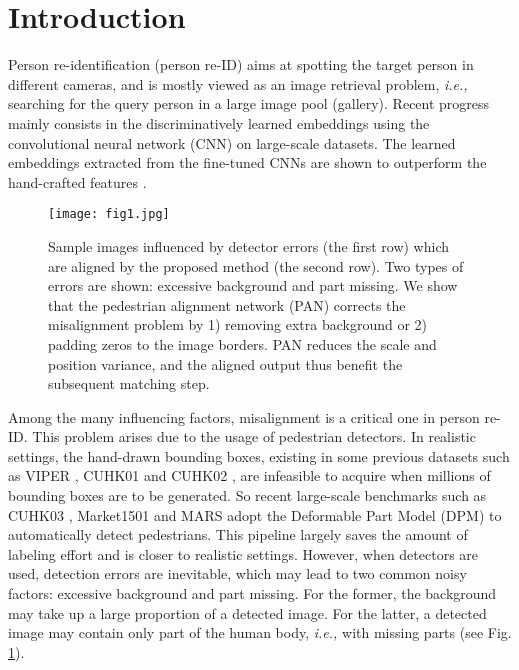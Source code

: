 \newcommand{\etal}{\mbox{\emph{et al.\ }}}
\newcommand{\ie}{\mbox{\emph{i.e.,\ }}}
\section{Introduction}


Person re-identification (person re-ID) aims at spotting the target person in different cameras, and is mostly viewed as an image retrieval problem, \emph{i.e.,} searching for the query person in a large image pool (gallery). Recent progress mainly consists in the discriminatively learned embeddings using the convolutional neural network (CNN) on large-scale datasets. The learned embeddings extracted from the fine-tuned CNNs are shown to outperform the hand-crafted features \cite{zheng2016survey,xiao2016learning,zhong2017re}. 





\begin{figure}[t]
\begin{center}
\texttt{[image: fig1.jpg]}
\end{center}
   \caption{Sample images influenced by detector errors (the first row) which are aligned by the proposed method (the second row). Two types of errors are shown: excessive background and part missing. We show that the pedestrian alignment network (PAN) corrects the misalignment problem by 1) removing extra background or 2) padding zeros to the image borders. PAN reduces the scale and position variance, and the aligned output thus benefit the subsequent matching step.
}
\label{fig:1}
\end{figure}

Among the many influencing factors, misalignment is a critical one in person re-ID. This problem arises due to the usage of pedestrian detectors. In realistic settings, the hand-drawn bounding boxes, existing in some previous datasets such as VIPER \cite{gray2007evaluating}, CUHK01 \cite{li2012human} and CUHK02 \cite{li2013locally}, are infeasible to acquire when millions of bounding boxes are to be generated. So recent large-scale benchmarks such as CUHK03 \cite{li2014deepreid}, Market1501 \cite{zheng2015scalable} and MARS \cite{zheng2016mars} adopt the Deformable Part Model (DPM) \cite{felzenszwalb2008discriminatively} to automatically detect pedestrians. This pipeline largely saves the amount of labeling effort and is closer to realistic settings. However,  when detectors are used, detection errors are inevitable, which may lead to two common noisy factors: excessive background and part missing. For the former, the background may take up a large proportion of a detected image. For the latter, a detected image may contain only part of the human body, \emph{i.e.,} with missing parts (see Fig. \ref{fig:1}). 

